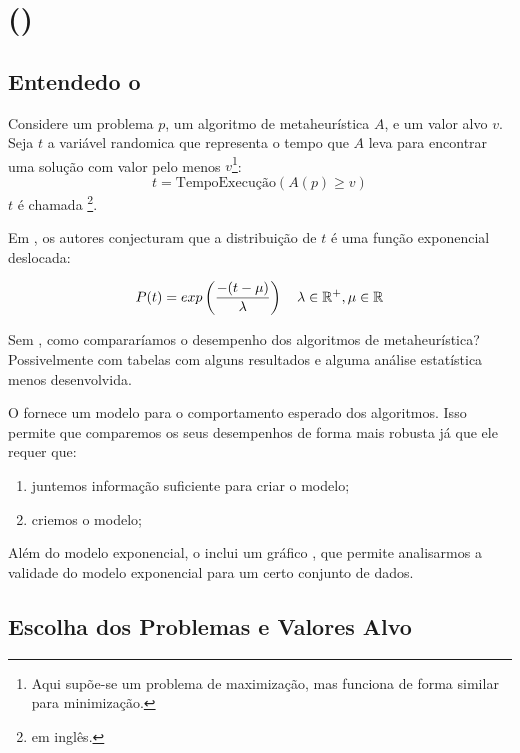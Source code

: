 \section{\tttfull (\ttt)}
\label{section:ttt-plot}

\subsection{Entendedo o \ttt}
\label{subsection:understanding-ttt}

Considere um problema $p$, um algoritmo de metaheurística $A$, e um valor alvo $v$. Seja $t$ a variável randomica que representa o tempo que $A$ leva para encontrar uma solução com valor pelo menos $v$\footnote{Aqui supõe-se um problema de maximização, mas funciona de forma similar para minimização.}:
\begin{equation}
    t = \mbox{TempoExecução}(A(p) \geqslant v)
\end{equation}
$t$ é chamada \tttvar\footnote{\tttvaren em inglês.}.

Em \cite{bib:ttt}, os autores conjecturam que a distribuição de $t$ é uma função exponencial deslocada:

\begin{equation}
    P(t) = exp\left(\dfrac{-(t-\mu)}{\lambda}\right)
    \quad \lambda \in \mathbb{R}^+, \mu \in \mathbb{R}
\end{equation}

Sem \ttt, como compararíamos o desempenho dos algoritmos de metaheurística? Possivelmente com tabelas com alguns resultados e alguma análise estatística menos desenvolvida.

O \ttt fornece um modelo para o comportamento esperado dos algoritmos. Isso permite que comparemos os seus desempenhos de forma mais robusta já que ele requer que:

\begin{enumerate}
    \item juntemos informação suficiente para criar o modelo;
    \item criemos o modelo;
\end{enumerate}

Além do modelo exponencial, o \ttt inclui um gráfico \qq, que permite analisarmos a validade do modelo exponencial para um certo conjunto de dados.

\subsection{Escolha dos Problemas e Valores Alvo}
\label{subsection:problems-target-values}

